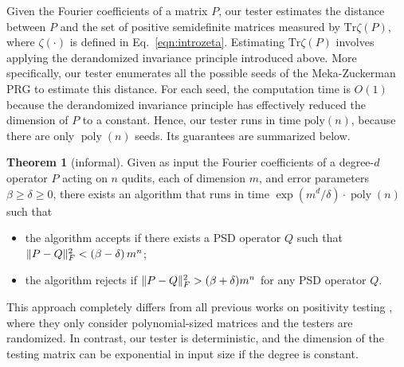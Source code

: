 \documentclass[11pt]{article}
\theoremstyle{plain}
\theoremstyle{definition}
\newcommand {\br} [1] {\ensuremath{ \left( #1 \right) }}
\DeclarePairedDelimiter{\norm}{\lVert}{\rVert}
\newcommand {\Tr} {\ensuremath{ \mathrm{Tr} }}
\newtheorem*{theorem*}{Theorem}
\newcommand{\poly} {\ensuremath{\operatorname{poly}}}
\newcommand{\1}{\mathbb{1}} %
\begin{document}
Given the Fourier coefficients of a matrix $P$,
our tester estimates the distance between $P$ and the set of positive semidefinite matrices measured by $\Tr\zeta\br{P}$, where $\zeta\br{\cdot}$ is defined in Eq.~\eqref{eqn:introzeta}. 
Estimating $\Tr\zeta\br{P}$ involves applying the derandomized invariance principle introduced above.
More specifically, our tester enumerates all the possible seeds of the Meka-Zuckerman PRG to estimate this distance.
For each seed, the computation time is $O(1)$ because the derandomized invariance principle has effectively reduced the dimension of $P$ to a constant.
Hence, our tester runs in time $\mathrm{poly}(n)$, because there are only $\poly(n)$ seeds. 
Its guarantees are summarized below.


\begin{theorem*}[informal]
  Given as input the Fourier coefficients of a degree-$d$ operator $P$ acting on $n$ qudits, each of dimension $m$, 
  and error parameters $\beta\ge\delta\ge0$,
there exists an algorithm that runs in time $\exp(m^d/\delta)\cdot \poly(n)$
  such that
  \begin{itemize}
    \item the algorithm accepts if there exists a PSD operator $Q$ such that $\norm{P-Q}_F^2<\br{\beta-\delta}m^n$;
\item the algorithm rejects if $\norm{P-Q}_F^2>(\beta+\delta)m^n$ for any PSD operator $Q$.
  \end{itemize}
\end{theorem*}

 This approach completely differs from all previous works on positivity testing \cite{9996743,han2017approximating,bakshi2020testing}, where they only consider polynomial-sized matrices and the testers are randomized. In contrast, our tester is deterministic, and the dimension of the testing matrix can be exponential in input size if the degree is constant.
\end{document}
